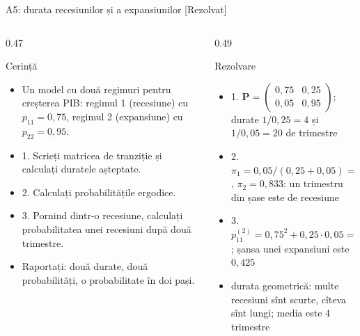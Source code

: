 \begin{frame}{A5: durata recesiunilor și a expansiunilor [Rezolvat]}
\itemsize{\scriptsize}
\begin{columns}[T]
\begin{column}{0.47\textwidth}
\begin{block}{Cerință}
\begin{itemize}
    \item Un model cu două regimuri pentru creșterea PIB: regimul 1 (recesiune) cu $p_{11} = 0{,}75$, regimul 2 (expansiune) cu $p_{22} = 0{,}95$.
    \item 1. Scrieți matricea de tranziție și calculați duratele așteptate.
    \item 2. Calculați probabilitățile ergodice.
    \item 3. Pornind dintr-o recesiune, calculați probabilitatea unei recesiuni după două trimestre.
    \item Raportați: două durate, două probabilități, o probabilitate în doi pași.
\end{itemize}
\end{block}
\end{column}
\begin{column}{0.49\textwidth}
\begin{exampleblock}{Rezolvare}
\begin{itemize}
    \item 1. $\mathbf{P} = \begin{pmatrix}0{,}75 & 0{,}25\\ 0{,}05 & 0{,}95\end{pmatrix}$; durate $1/0{,}25 = 4$ și $1/0{,}05 = 20$ de trimestre
    \item 2. $\pi_1 = 0{,}05/(0{,}25 + 0{,}05) = 0{,}167$, $\pi_2 = 0{,}833$: un trimestru din șase este de recesiune
    \item 3. $p^{(2)}_{11} = 0{,}75^2 + 0{,}25 \cdot 0{,}05 = 0{,}575$; șansa unei expansiuni este $0{,}425$
    \item durata geometrică: multe recesiuni sînt scurte, cîteva sînt lungi; media este 4 trimestre
\end{itemize}
\end{exampleblock}
\end{column}
\end{columns}
\end{frame}

